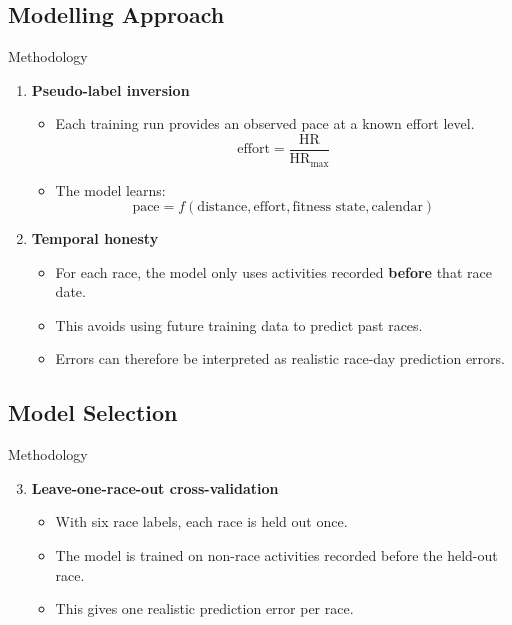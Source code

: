 \documentclass{beamer}
\begin{document}
\subsection{Modelling Approach}
\begin{frame}{Methodology}

\vspace{0.25cm}

\begin{enumerate}
    \item \textbf{Pseudo-label inversion}
    \begin{itemize}
        \item Each training run provides an observed pace at a known effort level.
        \[
            \text{effort} = \frac{\text{HR}}{\text{HR}_{\max}}
        \]
        \item The model learns:
        \[
            \text{pace} = f(\text{distance}, \text{effort}, \text{fitness state}, \text{calendar})
        \]
    \end{itemize}

    \vspace{0.15cm}

    \item \textbf{Temporal honesty}
    \begin{itemize}
        \item For each race, the model only uses activities recorded \textbf{before} that race date.
        \item This avoids using future training data to predict past races.
        \item Errors can therefore be interpreted as realistic race-day prediction errors.
    \end{itemize}
\end{enumerate}

\end{frame}

\subsection{Model Selection}

\begin{frame}{Methodology}

\begin{enumerate}
    \setcounter{enumi}{2}

    \item \textbf{Leave-one-race-out cross-validation}
    \begin{itemize}
        \item With six race labels, each race is held out once.
        \item The model is trained on non-race activities recorded before the held-out race.
        \item This gives one realistic prediction error per race.
    \end{itemize}

    \vspace{0.25cm}
\end{enumerate}
\end{frame}
\end{document}
